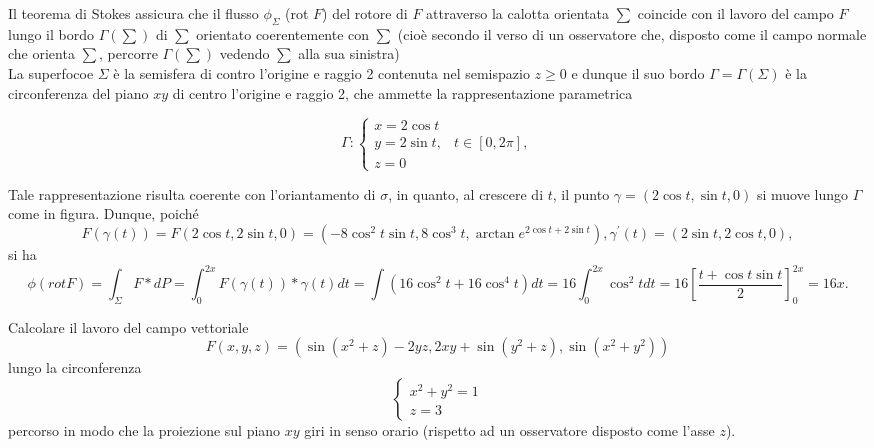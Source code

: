 \begin{svol}
  Il teorema di Stokes assicura che il flusso $\phi_\Sigma$ (rot $F$) del rotore di $F$ attraverso la calotta
  orientata $\sum$ coincide con il lavoro del campo $F$ lungo il bordo $\Gamma(\sum)$ di $\sum$ orientato
  coerentemente con $\sum$ (cioè secondo il verso di un osservatore che, disposto come il campo normale che
  orienta $\sum$, percorre $\Gamma(\sum)$ vedendo $\sum$ alla sua sinistra)\\
  La superfocoe $\Sigma$ è la semisfera di contro l'origine e raggio 2 contenuta nel semispazio $z\geq 0$ e
  dunque il suo bordo $\Gamma =\Gamma (\Sigma)$ è la circonferenza del piano $xy$ di centro l'origine e raggio 2,
  che ammette la rappresentazione parametrica
  \begin{multicols}{2}
    \begin{equation*}
      \Gamma:
      \begin{cases}
        x=2\cos t\\
        y=2\sin t, & t\in [0,2\pi],\\
        z=0
      \end{cases}
    \end{equation*}
  \end{multicols}
  Tale rappresentazione risulta coerente con l'oriantamento di $\sigma$, in quanto, al crescere di $t$,
  il punto $\gamma= (2\cos t, \sin t, 0)$ si muove lungo $\Gamma$ come in figura. Dunque, poiché
  \begin{equation*}
    F(\gamma(t))=F(2\cos t, 2\sin t,0)=(-8\cos^2t\sin t, 8\cos^3t, \arctan e^{2\cos t+2\sin t}),
    \gamma^\prime (t)=(2\sin t, 2\cos t, 0), 
  \end{equation*}
  si ha
  \begin{equation*}
    \phi(rot F)= \int_\Sigma F*dP=\int^{2x}_0F(\gamma(t)) *\gamma(t)dt=\int (16\cos^2t+16\cos^4t)dt =
    16\int^{2x}_{0}\cos^2tdt=16\left[\frac{t+\cos t \sin t}{2}\right]^{2x}_0=16x.
  \end{equation*}
\end{svol}
\clearpage
\begin{esercizio}
  Calcolare il lavoro del campo vettoriale
  \begin{equation*}
    F(x,y,z)=(\sin(x^2+z)- 2yz, 2xy+\sin(y^2+z),\sin(x^2+y^2))
  \end{equation*}
  lungo la circonferenza
  \begin{equation*}
    \begin{cases}
      x^2+y^2=1\\
        z=3
    \end{cases}
  \end{equation*}
  percorso in modo che la proiezione sul piano $xy$ giri in senso orario (rispetto ad un osservatore disposto come l'asse $z$).\\
\end{esercizio}
